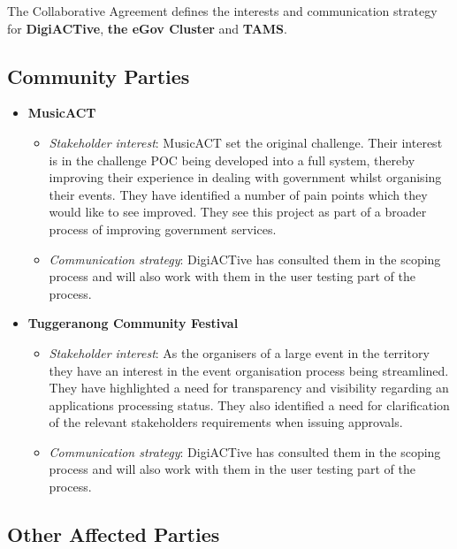 \documentclass[12pt,a4paper,twosided]{article}
\begin{document}
The Collaborative Agreement defines the interests and communication
strategy for \textbf{DigiACTive}, \textbf{the eGov Cluster} and
\textbf{TAMS}.

\subsection{Community Parties}

\begin{itemize}
\itemsep1pt\parskip0pt
\item
  \textbf{MusicACT}

  \begin{itemize}
  \itemsep1pt\parskip0pt
  \item
    \emph{Stakeholder interest}: MusicACT set the original challenge.
    Their interest is in the challenge POC being developed into a full
    system, thereby improving their experience in dealing with
    government whilst organising their events. They have identified a
    number of pain points which they would like to see improved. They
    see this project as part of a broader process of improving
    government services.
  \item
    \emph{Communication strategy}: DigiACTive has consulted them in the
    scoping process and will also work with them in the user testing
    part of the process.
  \end{itemize}
\item
  \textbf{Tuggeranong Community Festival}

  \begin{itemize}
  \itemsep1pt\parskip0pt
  \item
    \emph{Stakeholder interest}: As the organisers of a large event in
    the territory they have an interest in the event organisation
    process being streamlined. They have highlighted a need for
    transparency and visibility regarding an applications processing
    status. They also identified a need for clarification of the
    relevant stakeholders requirements when issuing approvals.
  \item
    \emph{Communication strategy}: DigiACTive has consulted them in the
    scoping process and will also work with them in the user testing
    part of the process.
  \end{itemize}
\end{itemize}

\subsection{Other Affected Parties}
\end{document}
